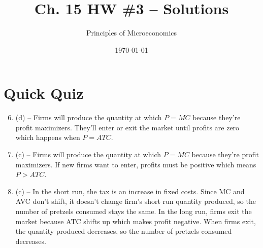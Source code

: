 \documentclass{article}
\title{Ch. 15 HW \#3 -- Solutions}
\author{Principles of Microeconomics}
\date{\today}
\begin{document}
\maketitle

\section*{Quick Quiz}

\begin{enumerate}

\setcounter{enumi}{5}
\item (d) -- Firms will produce the quantity at which $P = MC$ because they're profit maximizers. They'll enter or exit the market until profits are zero which happens when $P = ATC$.

\item (c) -- Firms will produce the quantity at which $P = MC$ because they're profit maximizers. If new firms want to enter, profits must be positive which means $P > ATC$.

\item (c) -- In the short run, the tax is an increase in fixed costs. Since MC and AVC don't shift, it doesn't change firm's short run quantity produced, so the number of pretzels consumed stays the same. In the long run, firms exit the market because ATC shifts up which makes profit negative. When firms exit, the quantity produced decreases, so the number of pretzels consumed decreases.

\end{enumerate}
\end{document}
